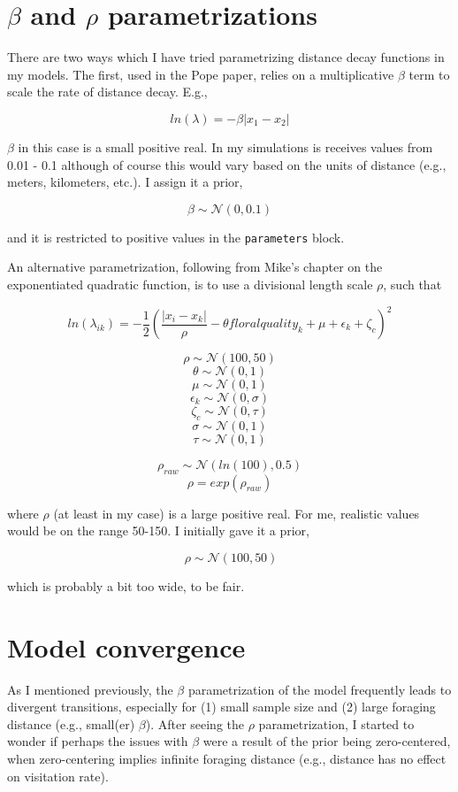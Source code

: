 \documentclass[12pt]{article}
\begin{document}
\section{$\beta$ and $\rho$ parametrizations}

There are two ways which I have tried parametrizing distance decay functions in my models. The first, used in the Pope paper, relies on a multiplicative $\beta$ term to scale the rate of distance decay. E.g.,

\[ln(\lambda) = -\beta |x_1 - x_2|\]

$\beta$ in this case is a small positive real. In my simulations is receives values from 0.01 - 0.1 although of course this would vary based on the units of distance (e.g., meters, kilometers, etc.). I assign it a prior,

\[
\beta \sim \mathcal{N}(0, 0.1)
\]

and it is restricted to positive values in the \texttt{parameters} block.

An alternative parametrization, following from Mike's chapter on the exponentiated quadratic function, is to use a divisional length scale $\rho$, such that

\[ln(\lambda_{ik}) = -\frac{1}{2}\left(\frac{|x_i - x_k|}{\rho} - \theta floralquality_k + \mu + \epsilon_k + \zeta_c\right)^2\]

\[ \rho \sim \mathcal{N}(100, 50)\]
\[ \theta \sim \mathcal{N}(0, 1)\]
\[ \mu \sim \mathcal{N}(0, 1)\]
\[ \epsilon_k \sim \mathcal{N}(0, \sigma)\]
\[ \zeta_c \sim \mathcal{N}(0, \tau)\]
\[ \sigma \sim \mathcal{N}(0, 1)\]
\[ \tau \sim \mathcal{N}(0, 1)\]

\[ \rho_{raw} \sim \mathcal{N}(ln(100), 0.5) \]
\[ \rho = exp(\rho_{raw}) \]

where $\rho$ (at least in my case) is a large positive real. For me, realistic values would be on the range 50-150. I initially gave it a prior,

\[\ \rho \sim \mathcal{N}(100, 50)\]



which is probably a bit too wide, to be fair.


\section{Model convergence}

As I mentioned previously, the $\beta$ parametrization of the model frequently leads to divergent transitions, especially for (1) small sample size and (2) large foraging distance (e.g., small(er) $\beta$). After seeing the $\rho$ parametrization, I started to wonder if perhaps the issues with $\beta$ were a result of the prior being zero-centered, when zero-centering implies infinite foraging distance (e.g., distance has no effect on visitation rate).
\end{document}
